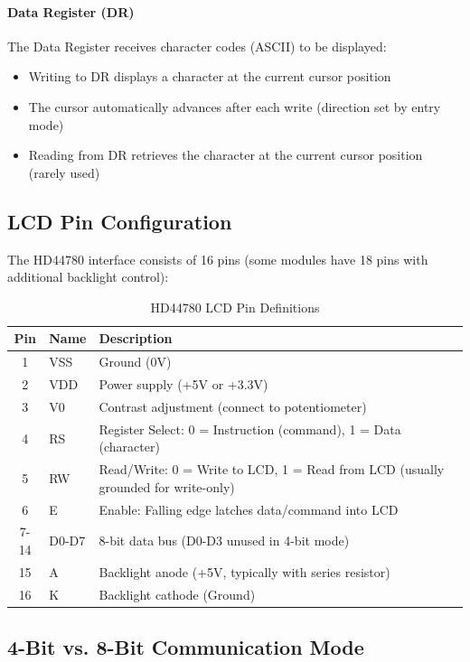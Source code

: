 \paragraph{Data Register (DR)}
The Data Register receives character codes (ASCII) to be displayed:
\begin{itemize}[nosep]
  \item Writing to DR displays a character at the current cursor position
  \item The cursor automatically advances after each write (direction set by entry mode)
  \item Reading from DR retrieves the character at the current cursor position (rarely used)
\end{itemize}

\subsection{LCD Pin Configuration}

The HD44780 interface consists of 16 pins (some modules have 18 pins with additional backlight control):

\begin{table}[H]
\centering
\small
\renewcommand{\arraystretch}{1.3}
\begin{tabular}{clp{8.5cm}}
\toprule
\textbf{Pin} & \textbf{Name} & \textbf{Description} \\
\midrule
1 & VSS & Ground (0V) \\
2 & VDD & Power supply (+5V or +3.3V) \\
3 & V0 & Contrast adjustment (connect to potentiometer) \\
4 & RS & Register Select: 0 = Instruction (command), 1 = Data (character) \\
5 & RW & Read/Write: 0 = Write to LCD, 1 = Read from LCD (usually grounded for write-only) \\
6 & E & Enable: Falling edge latches data/command into LCD \\
7-14 & D0-D7 & 8-bit data bus (D0-D3 unused in 4-bit mode) \\
15 & A & Backlight anode (+5V, typically with series resistor) \\
16 & K & Backlight cathode (Ground) \\
\bottomrule
\end{tabular}
\caption{HD44780 LCD Pin Definitions}
\end{table}

\subsection{4-Bit vs. 8-Bit Communication Mode}

